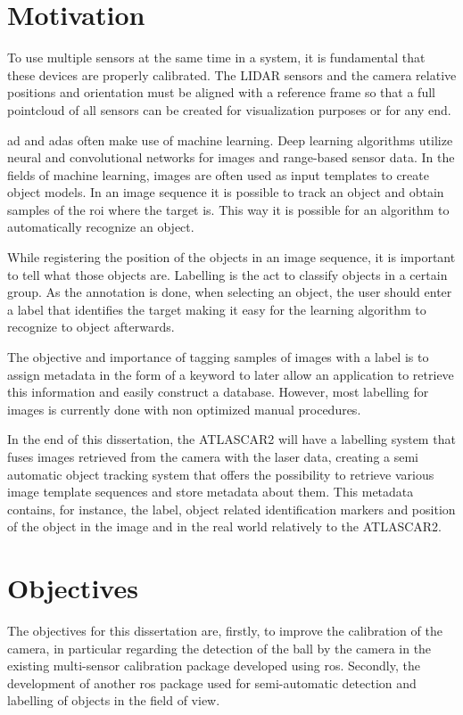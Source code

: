 \section{Motivation}
To use multiple sensors at the same time in a system, it is fundamental that these devices are properly calibrated. The LIDAR sensors and the camera relative positions and orientation must be aligned with a reference frame so that a full pointcloud of all sensors can be created for visualization purposes or for any end.

\gls{ad} and \gls{adas} often make use of machine learning. Deep learning algorithms utilize neural and convolutional networks for images and range-based sensor data. In the fields of machine learning, images are often used as input templates to create object models. In an image sequence it is possible to track an object and obtain samples of the \gls{roi} where the target is. This way it is possible for an algorithm to automatically recognize an object.

While registering the position of the objects in an image sequence, it is important to tell what those objects are. Labelling is the act to classify objects in a certain group. As the annotation is done, when selecting an object, the user should enter a label that identifies the target making it easy for the learning algorithm to recognize to object afterwards.

The objective and importance of tagging samples of images with a label is to assign metadata in the form of a keyword to later allow an application to retrieve this information and easily construct a database. However, most labelling for images is currently done with non optimized manual procedures.

In the end of this dissertation, the ATLASCAR2 will have a labelling system that fuses images retrieved from the camera with the laser data, creating a semi automatic object tracking system that offers the possibility to retrieve various image template sequences and store metadata about them. This metadata contains, for instance, the label, object related identification markers and position of the object in the image and in the real world relatively to the ATLASCAR2.

\section{Objectives}
The objectives for this dissertation are, firstly, to improve the calibration of the camera, in particular regarding the detection of the ball by the camera in the existing multi-sensor calibration package developed using \gls{ros}. Secondly, the development of another \gls{ros} package used for semi-automatic detection and labelling of objects in the field of view.

